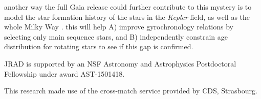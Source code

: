 \documentclass[manuscript, letterpaper]{aastex6}
\newcommand{\Kepler}{\textsl{Kepler}\xspace}
\begin{document}
another way the full Gaia release could further contribute to this mystery is to model the star formation history of the stars in the \Kepler field, as well as the whole Milky Way \citep[e.g.][]{bertelli1999}. this will help A) improve gyrochronology relations by selecting only main sequence stars, and B) independently constrain age distribution for rotating stars to see if this gap is confirmed.


\acknowledgments
JRAD is supported by an NSF Astronomy and Astrophysics Postdoctoral Fellowship under award AST-1501418.

This research made use of the cross-match service provided by CDS, Strasbourg.


\end{document}
